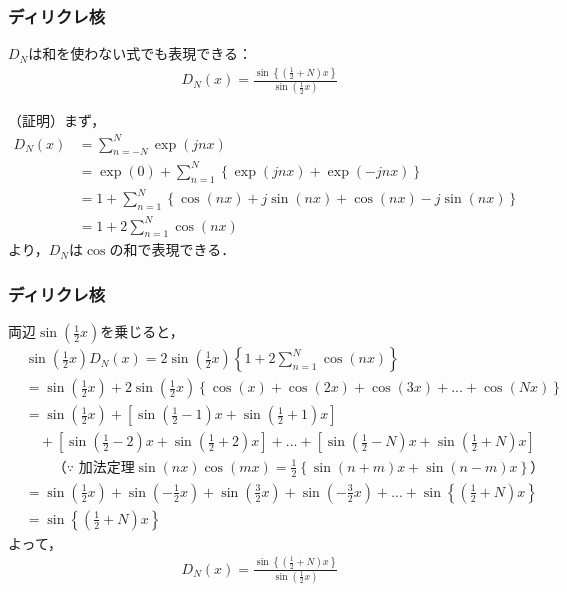 \documentclass[dvipdfmx,graphicx,14pt]{beamer}
\begin{document}
\begin{frame}[c]
    \frametitle{ディリクレ核}
    \begin{block}{}
        $D_{N}$は和を使わない式でも表現できる：
        \begin{align}
            D_{N}(x) = \frac{\sin\left\{\left(\frac{1}{2} + N\right)x\right\}}{\sin\left(\frac{1}{2}x\right)} \label{eq:dirichlet_kernel_sin}
        \end{align}
    \end{block}
    \scriptsize
    （証明）まず，
    \begin{align}
        D_{N}(x) &= \sum_{n=-N}^{N} \exp(jnx) \nonumber \\
        &= \exp(0) + \sum_{n=1}^{N} \left\{ \exp(jnx) + \exp(-jnx) \right\} \nonumber \\
        &= 1 + \sum_{n = 1}^{N} \left\{ \cos(nx) + j\sin(nx) + \cos(nx) - j\sin(nx)\right\} \nonumber \\
        &= 1 + 2 \sum_{n = 1}^{N} \cos(nx) \label{eq:dirichlet_kernel_cos}
    \end{align}
    より，$D_{N}$は$\cos$の和で表現できる．
\end{frame}

\begin{frame}[c]
    \frametitle{ディリクレ核}
    \scriptsize
    両辺$\sin\left(\frac{1}{2}x\right)$を乗じると，
    \begin{align*}
        & \sin\left(\frac{1}{2}x\right) D_{N}(x) = 2\sin\left(\frac{1}{2}x\right) \left\{ 1 + 2 \sum_{n = 1}^{N} \cos(nx) \right\} \\
        &= \sin\left(\frac{1}{2}x\right) + 2 \sin\left(\frac{1}{2}x\right)\left\{ \cos(x) + \cos(2x) + \cos(3x) + ... + \cos(Nx) \right\} \\
        &= \sin\left(\frac{1}{2}x\right) + \left[ \sin \left(\frac{1}{2} - 1\right)x + \sin \left(\frac{1}{2} + 1\right)x \right] \\
        &\quad + \left[ \sin \left(\frac{1}{2} - 2\right)x + \sin \left(\frac{1}{2} + 2\right)x \right] + ... + \left[ \sin \left(\frac{1}{2} - N\right)x + \sin \left(\frac{1}{2} + N\right)x \right] \\
        &\quad\quad \text{（$\because$ 加法定理$\sin(nx)\cos(mx) = \frac{1}{2} \left\{ \sin(n+m)x + \sin(n-m)x \right\}$）} \\
        &= \sin\left(\frac{1}{2}x\right) + \sin \left(-\frac{1}{2}x\right) + \sin \left(\frac{3}{2}x\right) + \sin \left(-\frac{3}{2}x\right) + ... + \sin\left\{ \left(\frac{1}{2} + N \right)x \right\} \\
        &= \sin\left\{ \left(\frac{1}{2} + N \right)x \right\}
    \end{align*}
    よって，
    \begin{align*}
        D_{N}(x) = \frac{\sin\left\{\left(\frac{1}{2} + N\right)x\right\}}{\sin\left(\frac{1}{2}x\right)}
    \end{align*}
\end{frame}
\end{document}

